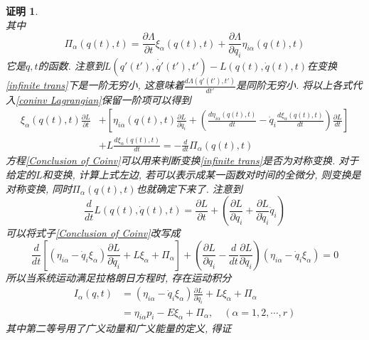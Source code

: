 \documentclass[a4paper,11pt]{article}
\theoremstyle{mystyle}
\newtheorem{Proof}{\hspace{2em}证明}[section]
\begin{document}
\begin{Proof}
\begin{equation*}
  \end{equation*}
  其中
  \begin{equation}\label{Pi_alpha}
    \Pi_\alpha(q(t),t)=\frac{\partial \Lambda}{\partial t}\xi_\alpha(q(t),t)+\frac{\partial \Lambda}{\partial{q_i}}\eta_{i\alpha}(q(t),t)
  \end{equation}
  它是$q,t$的函数. 注意到$L(q'(t'),\dot{q'}(t'),t')-L(q(t),\dot{q}(t),t)$在变换\eqref{infinite trans}下是一阶无穷小, 这意味着$\frac{d\Lambda(q'(t'),t')}{dt'}$是同阶无穷小. 将以上各式代入\eqref{coninv Lagrangian}保留一阶项可以得到
  \begin{equation}\label{Conclusion of Coinv}
  \begin{split}
     \xi_\alpha(q(t),t)\frac{\partial L}{\partial t}&+\left[\eta_{i\alpha}(q(t),t)\frac{\partial L}{\partial{q}_i}+\left(\frac{d\eta_{i\alpha}(q(t),t)}{dt}-\dot{q}_i\frac{d\xi_\alpha(q(t),t)}{dt}\right)\frac{\partial L}{dt}\right] \\
     &+L\frac{d\xi_\alpha(q(t),t)}{dt}=-\frac{d}{dt}\Pi_\alpha(q(t),t)
  \end{split}
  \end{equation}
  方程\eqref{Conclusion of Coinv}可以用来判断变换\eqref{infinite trans}是否为对称变换. 对于给定的$L$和变换, 计算上式左边, 若可以表示成某一函数对时间的全微分, 则变换是对称变换, 同时$\Pi_\alpha(q(t),t)$也就确定下来了. 注意到
  \begin{equation*}
    \frac{d}{dt}L(q(t),\dot{q}(t),t)=\frac{\partial L}{\partial t}+\left(\frac{\partial L}{\partial{q_i}}+\frac{\partial L}{\partial{\dot{q}_i}}\ddot{q}_i\right)
  \end{equation*}
  可以将式子\eqref{Conclusion of Coinv}改写成
  \begin{equation*}
    \frac{d}{dt}\left[(\eta_{i\alpha}-\dot{q}_i\xi_\alpha)\frac{\partial L}{\partial\dot{q}_i}+L\xi_\alpha+\Pi_\alpha\right]+\left(\frac{\partial L}{\partial{q}_i}-\frac{d}{dt}\frac{\partial L}{\partial\dot{q}_i}\right)(\eta_{i\alpha}-\dot{q}_i\xi_\alpha)=0
  \end{equation*}
  所以当系统运动满足拉格朗日方程时, 存在运动积分
  \begin{equation}\label{Movement Integrate}
  \begin{split}
     I_\alpha(q,t)&=(\eta_{i\alpha}-\dot{q}_i\xi_\alpha)\frac{\partial L}{\partial\dot{q}_i}+L\xi_\alpha+\Pi_\alpha \\
       &=\eta_{i\alpha}p_i-E\xi_\alpha+\Pi_\alpha,\quad (\alpha=1,2,\cdots,r)
  \end{split}
  \end{equation}
  其中第二等号用了广义动量和广义能量的定义, 得证
\end{Proof}
\end{document}
